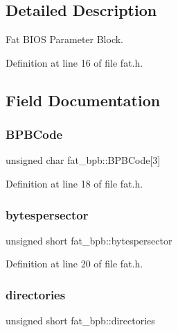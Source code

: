 \subsection{Detailed Description}
Fat B\+I\+OS Parameter Block. 

Definition at line 16 of file fat.\+h.



\subsection{Field Documentation}
\mbox{\label{structfat__bpb_a692e2fbe0857aa497a3bcf8ef2f14a5d_a692e2fbe0857aa497a3bcf8ef2f14a5d}} 
\subsubsection{\texorpdfstring{B\+P\+B\+Code}{BPBCode}}
{\footnotesize\ttfamily unsigned char fat\+\_\+bpb\+::\+B\+P\+B\+Code\mbox{[}3\mbox{]}}



Definition at line 18 of file fat.\+h.

\mbox{\label{structfat__bpb_a99b879ef2b4ebb9d64c3cd29a098cef8_a99b879ef2b4ebb9d64c3cd29a098cef8}} 
\subsubsection{\texorpdfstring{bytespersector}{bytespersector}}
{\footnotesize\ttfamily unsigned short fat\+\_\+bpb\+::bytespersector}



Definition at line 20 of file fat.\+h.

\mbox{\label{structfat__bpb_a9d593b3eed8b2aad45be25375b167b39_a9d593b3eed8b2aad45be25375b167b39}} 
\subsubsection{\texorpdfstring{directories}{directories}}
{\footnotesize\ttfamily unsigned short fat\+\_\+bpb\+::directories}



